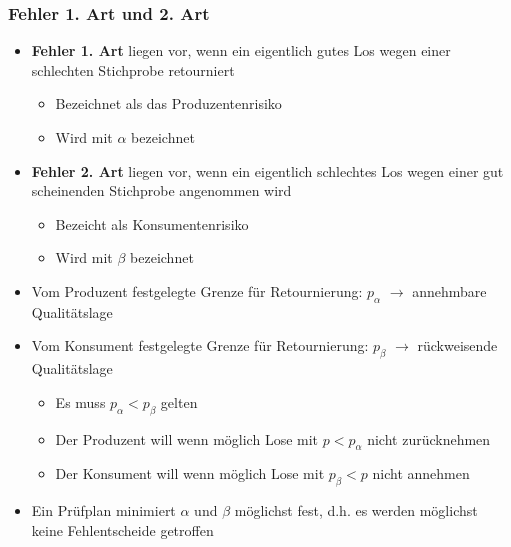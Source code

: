 \subsubsection{Fehler 1. Art und 2. Art}
\label{subsubsec:Fehler}
\begin{itemize}
	\item \textbf{Fehler 1. Art} liegen vor, wenn ein eigentlich gutes Los wegen einer schlechten Stichprobe retourniert
	\begin{itemize}
		\item Bezeichnet als das Produzentenrisiko
		\item Wird mit $\alpha$ bezeichnet
	\end{itemize}
	\item \textbf{Fehler 2. Art} liegen vor, wenn ein eigentlich schlechtes Los wegen einer gut scheinenden Stichprobe angenommen wird
	\begin{itemize}
		\item Bezeicht als Konsumentenrisiko
		\item Wird mit $\beta$ bezeichnet
	\end{itemize}
	\item Vom Produzent festgelegte Grenze für Retournierung: $p_\alpha$ $\rightarrow$ annehmbare Qualitätslage
	\item Vom Konsument festgelegte Grenze für Retournierung: $p_\beta$ $\rightarrow$ rückweisende Qualitätslage
	\begin{itemize}
		\item Es muss $p_\alpha<p_\beta$ gelten
		\item Der Produzent will wenn möglich Lose mit $p<p_\alpha$ nicht zurücknehmen
		\item Der Konsument will wenn möglich Lose mit $p_\beta<p$ nicht annehmen
	\end{itemize}
	\item Ein Prüfplan minimiert $\alpha$ und $\beta$ möglichst fest, d.h. es werden möglichst keine Fehlentscheide getroffen
\end{itemize}

